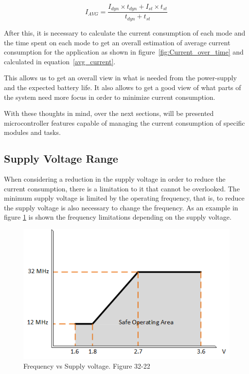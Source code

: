 \documentclass[11pt,a4paper]{report}
\begin{document}
\begin{equation} \label{avg_current}
I_{AVG} = \dfrac{I_{dyn}\times t_{dyn} + I_{st}\times t_{st}}{t_{dyn} + t_{st}}
\end{equation}

After this, it is necessary to calculate the current consumption of each mode and the time spent on each mode to get an overall estimation of  average current consumption for the application as shown in figure~\ref{fig:Current_over_time} and calculated in equation~\ref{avg_current}.

This allows us to get an overall view in what is needed from the power-supply and the expected battery life. It also allows to get a good view of what parts of the system need more focus in order to minimize current consumption.

With these thoughts in mind, over the next sections, will be presented microcontroller features capable of managing the current consumption of specific modules and tasks.

\subsection{Supply Voltage Range}\label{Supply_voltage_range}

When considering a reduction in the supply voltage in order to reduce the current consumption, there is a limitation to it that cannot be overlooked. The minimum supply voltage is limited by the operating frequency, that is, to reduce the supply voltage is also necessary to change the frequency. As an example in figure \ref{fig:frequency_over_voltage} is shown the frequency limitations depending on the supply voltage.

\begin{figure}[ht!]
\centering
\includegraphics[width=0.9\linewidth]{./frequency_over_voltage}
\caption{Frequency vs Supply voltage. Figure 32-22 \cite{Atmel_ATxmegaxxx}}
\label{fig:frequency_over_voltage}
\end{figure}
\end{document}
